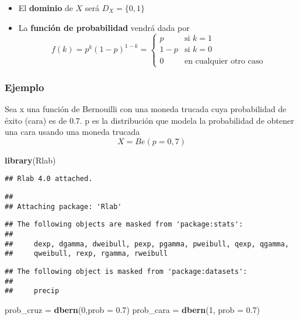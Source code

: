 \documentclass[
]{article}
\newenvironment{Shaded}{\begin{snugshade}}{\end{snugshade}}
\newcommand{\AttributeTok}[1]{\textcolor[rgb]{0.13,0.29,0.53}{#1}}
\newcommand{\DecValTok}[1]{\textcolor[rgb]{0.00,0.00,0.81}{#1}}
\newcommand{\FloatTok}[1]{\textcolor[rgb]{0.00,0.00,0.81}{#1}}
\newcommand{\FunctionTok}[1]{\textcolor[rgb]{0.13,0.29,0.53}{\textbf{#1}}}
\newcommand{\NormalTok}[1]{#1}
\newcommand{\OtherTok}[1]{\textcolor[rgb]{0.56,0.35,0.01}{#1}}
\providecommand{\tightlist}{%
  \setlength{\itemsep}{0pt}\setlength{\parskip}{0pt}}
\begin{document}
\begin{itemize}
\tightlist
\item
  El \textbf{dominio} de \(X\) será \(D_X = \{0,1\}\)
\item
  La \textbf{función de probabilidad} vendrá dada por
  \[f(k) = p^k(1-p)^{1-k} =  \left\{
  \begin{array}{rl}
     p & \text{si } k=1 
  \\ 1-p & \text{si } k=0
  \\ 0 & \text{en cualquier otro caso}
  \end{array}
  \right.\]
\end{itemize}

\hypertarget{ejemplo}{%
\subsubsection{Ejemplo}\label{ejemplo}}

Sea x una función de Bernouilli con una moneda trucada cuya probabilidad
de éxito (cara) es de 0.7. p es la distribución que modela la
probabilidad de obtener una cara usando una moneda trucada
\[ X = Be(p=0,7)\]

\begin{Shaded}
\begin{Highlighting}[]
\FunctionTok{library}\NormalTok{(Rlab)}
\end{Highlighting}
\end{Shaded}

\begin{verbatim}
## Rlab 4.0 attached.
\end{verbatim}

\begin{verbatim}
## 
## Attaching package: 'Rlab'
\end{verbatim}

\begin{verbatim}
## The following objects are masked from 'package:stats':
## 
##     dexp, dgamma, dweibull, pexp, pgamma, pweibull, qexp, qgamma,
##     qweibull, rexp, rgamma, rweibull
\end{verbatim}

\begin{verbatim}
## The following object is masked from 'package:datasets':
## 
##     precip
\end{verbatim}

\begin{Shaded}
\begin{Highlighting}[]
\NormalTok{prob\_cruz }\OtherTok{=} \FunctionTok{dbern}\NormalTok{(}\DecValTok{0}\NormalTok{,}\AttributeTok{prob =} \FloatTok{0.7}\NormalTok{)}
\NormalTok{prob\_cara }\OtherTok{=} \FunctionTok{dbern}\NormalTok{(}\DecValTok{1}\NormalTok{, }\AttributeTok{prob =} \FloatTok{0.7}\NormalTok{)}
\end{Highlighting}
\end{Shaded}
\end{document}
